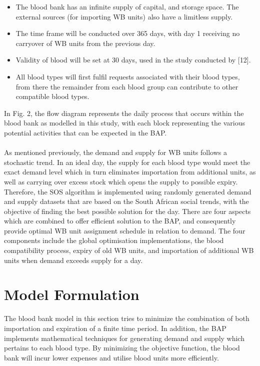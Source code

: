 \documentclass{article}
\begin{document}
\begin{itemize}
\item The blood bank has an infinite supply of capital, and storage space. The external sources (for importing WB units) also have a limitless supply.
\item The time frame will be conducted over 365 days, with day 1 receiving no carryover of WB units from the previous day.
\item Validity of blood will be set at 30 days, used in the study conducted by [12].
\item All blood types will first fulfil requests associated with their blood types, from there the remainder from each blood group can contribute to other compatible blood types.

\end{itemize}
In Fig. 2, the flow diagram represents the daily process that occurs within the blood bank as modelled in this study, with each block representing the various potential activities that can be expected in the BAP. 
\\
\\
As mentioned previously, the demand and supply for WB units follows a stochastic trend. In an ideal day, the supply for each blood type would meet the exact demand level which in turn eliminates importation from additional units, as well as carrying over excess stock which opens the supply to possible expiry. Therefore, the SOS algorithm is implemented using randomly generated demand and supply datasets that are based on the South African social trends, with the objective of finding the best possible solution for the day. There are four aspects which are combined to offer efficient solution to the BAP, and consequently provide optimal WB unit assignment schedule in relation to demand. The four components include the global optimisation implementations, the blood compatibility process, expiry of old WB units, and importation of additional WB units when demand exceeds supply for a day. 
\section{Model Formulation}
The blood bank model in this section tries to minimize the combination of both importation and expiration of a finite time period. In addition, the BAP implements mathematical techniques for generating demand and supply which pertains to each blood type. By minimizing the objective function, the blood bank will incur lower expenses and utilise blood units more efficiently.
\end{document}
